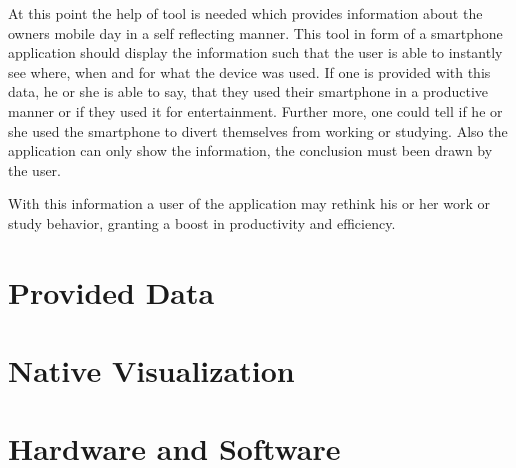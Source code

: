 At  this point the help of tool is needed which provides information about the owners mobile day in a self reflecting manner. This tool in form of a smartphone application should display the information such that the user is able to instantly see where, when and for what the device was used. If one is provided with this data, he or she is able to say, that they used their smartphone in a productive manner or if they used it for entertainment. Further more, one could tell if he or she used the smartphone to divert themselves from working or studying. Also the application can only show the information, the conclusion must been drawn by the user. 

With this information a user of the application may rethink his or her work or study behavior, granting a boost in productivity and efficiency.


\newpage
\section{Provided Data}

\newpage
\section{Native Visualization}

\newpage
\section{Hardware and Software}